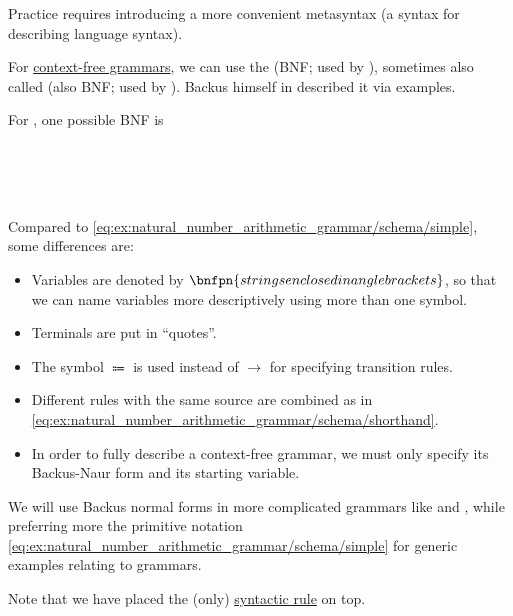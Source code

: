 \begin{remark}\label{con:backus_normal_form}
  Practice requires introducing a more convenient metasyntax (a syntax for describing language syntax).

  For \hyperref[def:chomsky_hierarchy/context_free]{context-free grammars}, we can use the  (BNF; used by ), sometimes also called  (also BNF; used by ). Backus himself in \cite[5]{Backus1959Syntax} described it via examples.

  For , one possible BNF is
  \begin{bnf*}
         { \bnfor \bnftsq{(} \bnfsp {} \bnfsp {} \bnfsp {} \bnfsp \bnftsq{)}} \\
          {\bnftsq{\( \syntimes \)} \bnfor \bnftsq{\( \syntimes \)}} \\
     { \bnfor {} \bnfor {} \bnfsp {}} \\
       { \bnfor {} \bnfsp {} \bnfor {} \bnfor {} \bnfsp {}}
  \end{bnf*}

  Compared to \eqref{eq:ex:natural_number_arithmetic_grammar/schema/simple}, some differences are:
  \begin{itemize}
    \item Variables are denoted by \( \bnfpn{strings enclosed in angle brackets} \), so that we can name variables more descriptively using more than one symbol.
    \item Terminals are put in \enquote{quotes}.
    \item The symbol \( \Coloneqq \) is used instead of \( \to \) for specifying transition rules.
    \item Different rules with the same source are combined as in \eqref{eq:ex:natural_number_arithmetic_grammar/schema/shorthand}.
    \item In order to fully describe a context-free grammar, we must only specify its Backus-Naur form and its starting variable.
  \end{itemize}
\end{remark}
\begin{comments}
  \item We will use Backus normal forms in more complicated grammars like  and , while preferring more the primitive notation \eqref{eq:ex:natural_number_arithmetic_grammar/schema/simple} for generic examples relating to grammars.
  \item Note that we have placed the (only) \hyperref[con:abstract_syntax_tree/syntactic]{syntactic rule} on top.
\end{comments}

